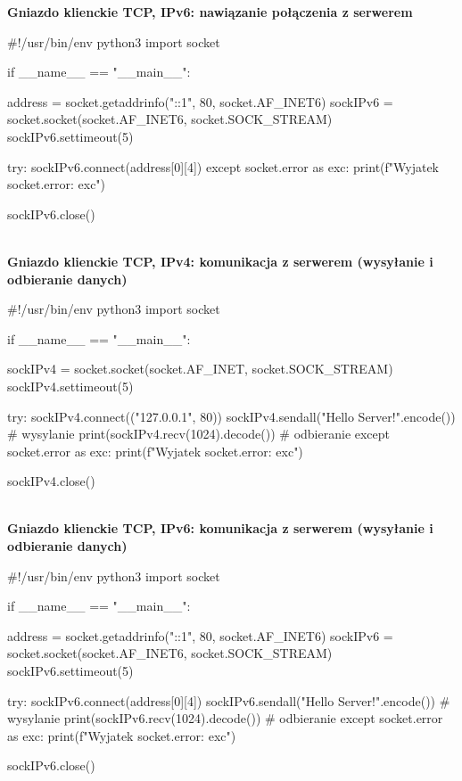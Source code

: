 \noindent \textbf{Gniazdo klienckie TCP, IPv6: nawiązanie połączenia z serwerem}

\begin{code}
#!/usr/bin/env python3
import socket

if __name__ == "__main__":

    address = socket.getaddrinfo("::1", 80, socket.AF_INET6)
    sockIPv6 = socket.socket(socket.AF_INET6, socket.SOCK_STREAM)
    sockIPv6.settimeout(5)

    try:
        sockIPv6.connect(address[0][4])
    except socket.error as exc:
        print(f"Wyjatek socket.error: {exc}")

    sockIPv6.close()
\end{code}\mbox{}\\

\newpage
\noindent \textbf{Gniazdo klienckie TCP, IPv4: komunikacja z serwerem (wysyłanie i odbieranie danych)}

\begin{code}
#!/usr/bin/env python3
import socket

if __name__ == "__main__":

    sockIPv4 = socket.socket(socket.AF_INET, socket.SOCK_STREAM)
    sockIPv4.settimeout(5)

    try:
        sockIPv4.connect(("127.0.0.1", 80))
        sockIPv4.sendall("Hello Server!".encode())	# wysylanie
        print(sockIPv4.recv(1024).decode())								# odbieranie
    except socket.error as exc:
        print(f"Wyjatek socket.error: {exc}")

    sockIPv4.close()
\end{code}\mbox{}\\

\noindent \textbf{Gniazdo klienckie TCP, IPv6: komunikacja z serwerem (wysyłanie i odbieranie danych)}

\begin{code}
#!/usr/bin/env python3
import socket

if __name__ == "__main__":

    address = socket.getaddrinfo("::1", 80, socket.AF_INET6)
    sockIPv6 = socket.socket(socket.AF_INET6, socket.SOCK_STREAM)
    sockIPv6.settimeout(5)

    try:
        sockIPv6.connect(address[0][4])
        sockIPv6.sendall("Hello Server!".encode())	# wysylanie
        print(sockIPv6.recv(1024).decode())								# odbieranie
    except socket.error as exc:
        print(f"Wyjatek socket.error: {exc}")

    sockIPv6.close()
\end{code}\mbox{}\\


